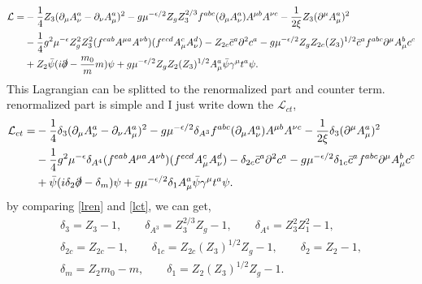 \documentclass[a4paper,12pt]{article}
\begin{document}
\begin{equation}\label{lren}
    \begin{split}
        \mathcal{L}=&-\frac{1}{4}Z_3(\partial_{\mu}A_{\nu}^{a}-\partial_{\nu}A_{\mu}^{a})^{2}-g\mu^{-\epsilon/2} Z_gZ_3^{2/3}f^{abc}(\partial_{\mu}A_{\nu}^{a})A^{\mu b}A^{\nu c}-\frac{1}{2\xi}Z_3(\partial^\mu A^a_{\mu})^2\\
        &-\frac{1}{4}g^{2}\mu^{-\epsilon}Z_g^2 Z_3^2(f^{eab}A^{\mu a}A^{\nu b})(f^{ecd}A_{\mu}^{c}A_{\nu}^{d})-Z_{2c}\bar{c}^{a}\partial^{2}c^{a}-g\mu^{-\epsilon/2} Z_gZ_{2c}(Z_3)^{1/2}\bar{c}^{a}f^{abc}\partial^{\mu}A_{\mu}^{b}c^{c}\\
        &+Z_2\bar{\psi}(i\slashed{\partial}-\frac{m_0}{m} m)\psi+g\mu^{-\epsilon/2} Z_gZ_2(Z_3)^{1/2} A_\mu^a \bar{\psi} \gamma^\mu t^a \psi.
        \end{split}
\end{equation}
This Lagrangian can be splitted to the renormalized part and counter term. renormalized part is simple and I just write down the $\mathcal{L}_{ct}$,
\begin{equation}\label{lct}
    \begin{split}
        \mathcal{L}_{ct}=&-\frac{1}{4}\delta_3(\partial_{\mu}A_{\nu}^{a}-\partial_{\nu}A_{\mu}^{a})^{2}-g\mu^{-\epsilon/2} \delta_{A^3}f^{abc}(\partial_{\mu}A_{\nu}^{a})A^{\mu b}A^{\nu c}-\frac{1}{2\xi}\delta_3(\partial^\mu A^a_{\mu})^2\\
        &-\frac{1}{4}g^{2}\mu^{-\epsilon}\delta_{A^4}(f^{eab}A^{\mu a}A^{\nu b})(f^{ecd}A_{\mu}^{c}A_{\nu}^{d})-\delta_{2c}\bar{c}^{a}\partial^{2}c^{a}-g\mu^{-\epsilon/2} \delta_{1c}\bar{c}^{a}f^{abc}\partial^{\mu}A_{\mu}^{b}c^{c}\\
        &+\bar{\psi}(i \delta_2\slashed{\partial}-\delta_m)\psi + g\mu^{-\epsilon/2} \delta_1 A_\mu^a \bar{\psi} \gamma^\mu t^a \psi.
        \end{split}
\end{equation}
by comparing \eqref{lren} and \eqref{lct}, we can get,
\begin{equation}
    \begin{split}
    \delta_3=Z_3-1,\qquad \delta_{A^3}=Z_3^{2/3}Z_g-1,\qquad \delta_{A^4}=Z_3^2 Z^2_1-1,\\
    \delta_{2c}=Z_{2c}-1,\qquad \delta_{1c}=Z_{2c}(Z_3)^{1/2}Z_g-1,\qquad \delta_2=Z_2-1,\\
    \delta_m=Z_2m_0-m,\qquad \delta_1=Z_2(Z_3)^{1/2}Z_g-1.
    \end{split}
\end{equation}
\end{document}
